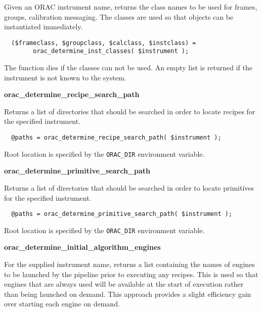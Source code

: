 \begin{description}
\item[\textbf{orac\_determine\_inst\_classes}] \mbox{}

Given an ORAC instrument name, returns the class names to be
used for frames, groups, calibration messaging. The classes
are used so that objects can be instantiated immediately.

\begin{verbatim}
  ($frameclass, $groupclass, $calclass, $instclass) =
        orac_determine_inst_classes( $instrument );
\end{verbatim}


The function dies if the classes can not be used.
An empty list is returned if the instrument is not known
to the system.

\item \textbf{\textbf{orac\_determine\_recipe\_search\_path}}

Returns a list of directories that should be searched in order
to locate recipes for the specified instrument.

\begin{verbatim}
  @paths = orac_determine_recipe_search_path( $instrument );
\end{verbatim}


Root location is specified by the \texttt{ORAC\_DIR} environment
variable.

\item \textbf{\textbf{orac\_determine\_primitive\_search\_path}}

Returns a list of directories that should be searched in order
to locate primitives for the specified instrument.

\begin{verbatim}
  @paths = orac_determine_primitive_search_path( $instrument );
\end{verbatim}


Root location is specified by the \texttt{ORAC\_DIR} environment
variable.

\item \textbf{\textbf{orac\_determine\_initial\_algorithm\_engines}}

For the supplied instrument name, returns a list containing the names
of engines to be launched by the pipeline prior to executing any
recipes. This is used so that engines that are always used will be
available at the start of execution rather than being launched on
demand. This approach provides a slight efficiency gain over starting
each engine on demand.


\end{description}
